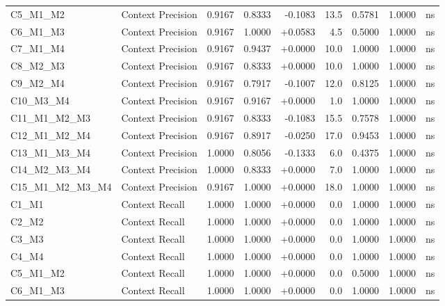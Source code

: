 \begin{table}[p]
\begin{tabular*}{\textwidth}{@{\extracolsep{\fill}} l l r r r r r r c @{}}
\addlinespace
C5\_M1\_M2      & Context Precision    & 0.9167 & 0.8333 & -0.1083 & 13.5 & 0.5781 & 1.0000 & ns \\
\addlinespace
C6\_M1\_M3      & Context Precision    & 0.9167 & 1.0000 & +0.0583 & 4.5 & 0.5000 & 1.0000 & ns \\
\addlinespace
C7\_M1\_M4      & Context Precision    & 0.9167 & 0.9437 & +0.0000 & 10.0 & 1.0000 & 1.0000 & ns \\
\addlinespace
C8\_M2\_M3      & Context Precision    & 0.9167 & 0.8333 & +0.0000 & 10.0 & 1.0000 & 1.0000 & ns \\
\addlinespace
C9\_M2\_M4      & Context Precision    & 0.9167 & 0.7917 & -0.1007 & 12.0 & 0.8125 & 1.0000 & ns \\
\addlinespace
C10\_M3\_M4     & Context Precision    & 0.9167 & 0.9167 & +0.0000 & 1.0 & 1.0000 & 1.0000 & ns \\
\addlinespace
C11\_M1\_M2\_M3 & Context Precision    & 0.9167 & 0.8333 & -0.1083 & 15.5 & 0.7578 & 1.0000 & ns \\
\addlinespace
C12\_M1\_M2\_M4 & Context Precision    & 0.9167 & 0.8917 & -0.0250 & 17.0 & 0.9453 & 1.0000 & ns \\
\addlinespace
C13\_M1\_M3\_M4 & Context Precision    & 1.0000 & 0.8056 & -0.1333 & 6.0 & 0.4375 & 1.0000 & ns \\
\addlinespace
C14\_M2\_M3\_M4 & Context Precision    & 1.0000 & 0.8333 & +0.0000 & 7.0 & 1.0000 & 1.0000 & ns \\
\addlinespace
C15\_M1\_M2\_M3\_M4 & Context Precision    & 0.9167 & 1.0000 & +0.0000 & 18.0 & 1.0000 & 1.0000 & ns \\
\addlinespace
C1\_M1          & Context Recall       & 1.0000 & 1.0000 & +0.0000 & 0.0 & 1.0000 & 1.0000 & ns \\
\addlinespace
C2\_M2          & Context Recall       & 1.0000 & 1.0000 & +0.0000 & 0.0 & 1.0000 & 1.0000 & ns \\
\addlinespace
C3\_M3          & Context Recall       & 1.0000 & 1.0000 & +0.0000 & 0.0 & 1.0000 & 1.0000 & ns \\
\addlinespace
C4\_M4          & Context Recall       & 1.0000 & 1.0000 & +0.0000 & 0.0 & 1.0000 & 1.0000 & ns \\
\addlinespace
C5\_M1\_M2      & Context Recall       & 1.0000 & 1.0000 & +0.0000 & 0.0 & 0.5000 & 1.0000 & ns \\
\addlinespace
C6\_M1\_M3      & Context Recall       & 1.0000 & 1.0000 & +0.0000 & 0.0 & 1.0000 & 1.0000 & ns \\

\end{tabular*}
\end{table}
